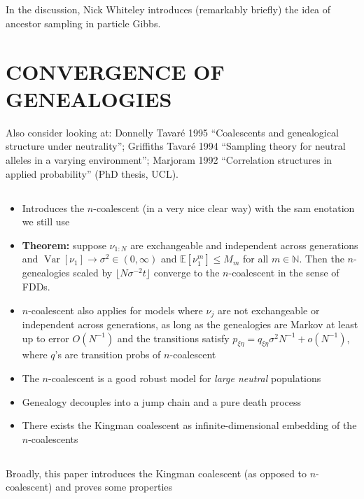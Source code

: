 \documentclass{article}
\newcommand{\E}{\mathbb{E}}
\newcommand{\V}{\operatorname{Var}}
\begin{document}
\subsection*{\cite{whiteley2010}}
In the discussion, Nick Whiteley introduces (remarkably briefly) the idea of ancestor sampling in particle Gibbs.

%
\section*{CONVERGENCE OF GENEALOGIES}

Also consider looking at: Donnelly Tavar\'e 1995 ``Coalescents and genealogical structure under neutrality''; Griffiths Tavar\'e 1994 ``Sampling theory for neutral alleles in a varying environment''; Marjoram 1992 ``Correlation structures in applied probability'' (PhD thesis, UCL).

\subsection*{\cite{kingman1982gene}}
\begin{itemize}
\item Introduces the $n$-coalescent (in a very nice clear way) with the sam enotation we still use
\item \textbf{Theorem:} suppose $\nu_{1:N}$ are exchangeable and independent across generations and $\V[\nu_1]\to\sigma^2 \in (0,\infty)$ and $\E[\nu_1^m] \leq M_m$ for all $m\in\mathbb{N}$. Then the $n$-genealogies scaled by $\lfloor N\sigma^{-2}t \rfloor$ converge to the $n$-coalescent in the sense of FDDs.
\item $n$-coalescent also applies for models where $\nu_j$ are not exchangeable or independent across generations, as long as the genealogies are Markov at least up to error $O(N^{-1})$ and the transitions satisfy $p_{\xi\eta} = q_{\xi\eta}\sigma^2 N^{-1} + o(N^{-1})$, where $q$'s are transition probs of $n$-coalescent
\item The $n$-coalescent is a good robust model for \emph{large neutral} populations
\item Genealogy decouples into a jump chain and a pure death process
\item There exists the Kingman coalescent as infinite-dimensional embedding of the $n$-coalescents
\end{itemize}


\subsection*{\cite{kingman1982coal}}
Broadly, this paper introduces the Kingman coalescent (as opposed to $n$-coalescent) and proves some properties
\end{document}
